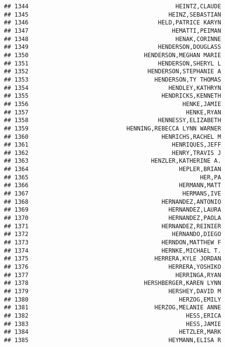 \documentclass[
]{article}
\begin{document}
\begin{verbatim}
## 1344                                          HEINTZ,CLAUDE
## 1345                                        HEINZ,SEBASTIAN
## 1346                                     HELD,PATRICE KARYN
## 1347                                         HEMATTI,PEIMAN
## 1348                                          HENAK,CORINNE
## 1349                                     HENDERSON,DOUGLASS
## 1350                                 HENDERSON,MEGHAN MARIE
## 1351                                     HENDERSON,SHERYL L
## 1352                                  HENDERSON,STEPHANIE A
## 1353                                    HENDERSON,TY THOMAS
## 1354                                        HENDLEY,KATHRYN
## 1355                                      HENDRICKS,KENNETH
## 1356                                            HENKE,JAMIE
## 1357                                             HENKE,RYAN
## 1358                                     HENNESSY,ELIZABETH
## 1359                            HENNING,REBECCA LYNN WARNER
## 1360                                      HENRICHS,RACHEL M
## 1361                                         HENRIQUES,JEFF
## 1362                                         HENRY,TRAVIS J
## 1363                                   HENZLER,KATHERINE A.
## 1364                                           HEPLER,BRIAN
## 1365                                                 HER,PA
## 1366                                           HERMANN,MATT
## 1367                                            HERMANS,IVE
## 1368                                      HERNANDEZ,ANTONIO
## 1369                                        HERNANDEZ,LAURA
## 1370                                        HERNANDEZ,PAOLA
## 1371                                      HERNANDEZ,REINIER
## 1372                                         HERNANDO,DIEGO
## 1373                                      HERNDON,MATTHEW F
## 1374                                      HERNKE,MICHAEL T.
## 1375                                    HERRERA,KYLE JORDAN
## 1376                                        HERRERA,YOSHIKO
## 1377                                          HERRINGA,RYAN
## 1378                                 HERSHBERGER,KAREN LYNN
## 1379                                        HERSHEY,DAVID M
## 1380                                           HERZOG,EMILY
## 1381                                    HERZOG,MELANIE ANNE
## 1382                                             HESS,ERICA
## 1383                                             HESS,JAMIE
## 1384                                           HETZLER,MARK
## 1385                                        HEYMANN,ELISA R

\end{verbatim}
\end{document}
